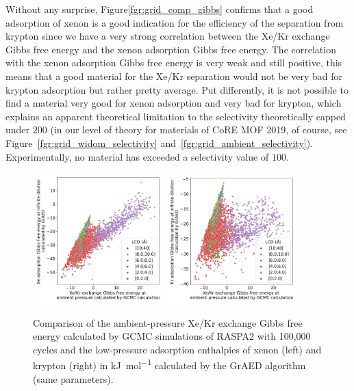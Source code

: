 \documentclass[main]{subfiles}
\begin{document}
Without any surprise, Figure\ref{fgr:grid_comp_gibbs} confirms that a good adsorption of xenon is a good indication for the efficiency of the separation from krypton since we have a very strong correlation between the Xe/Kr exchange Gibbs free energy and the xenon adsorption Gibbs free energy. The correlation with the xenon adsorption Gibbs free energy is very weak and still positive, this means that a good material for the Xe/Kr separation would not be very bad for krypton adsorption but rather pretty average. Put differently, it is not possible to find a material very good for xenon adsorption and very bad for krypton, which explains an apparent theoretical limitation to the selectivity theoretically capped under $200$ (in our level of theory for materials of CoRE MOF 2019, of course, see Figure~\ref{fgr:grid_widom_selectivity} and~\ref{fgr:grid_ambient_selectivity}). Experimentally, no material has exceeded a selectivity value of $100$.

\begin{figure}[ht]
  \centering
    \includegraphics[width=0.45\textwidth]{figures/3-fastsim/G_2080_vs_H_Xe_grid_overview.jpg}
    \includegraphics[width=0.45\textwidth]{figures/3-fastsim/G_2080_vs_H_Kr_grid_overview.jpg}
    \caption{Comparison of the ambient-pressure Xe/Kr exchange Gibbs free energy calculated by GCMC simulations of RASPA2 with 100,000 cycles and the low-pressure adsorption enthalpies of xenon (left) and krypton (right) in \si{\kilo\joule\per\mole} calculated by the GrAED algorithm (same parameters).}\label{fgr:grid_comp_enthalpy}
\end{figure}
\end{document}
